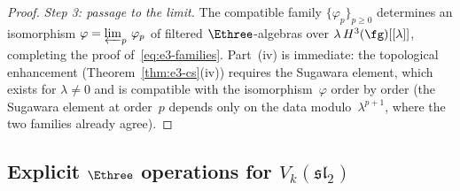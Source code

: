 \begin{proof}
\smallskip
\noindent\textit{Step 3: passage to the limit.}
The compatible family $\{\varphi_p\}_{p \geq 0}$
determines an isomorphism
$\varphi = \varprojlim_p\,\varphi_p$
of filtered $\Ethree$-algebras over
$\lambda\,H^3(\fg)[[\lambda]]$, completing the proof
of~\eqref{eq:e3-families}.
Part~(iv) is immediate: the topological enhancement
(Theorem~\ref{thm:e3-cs}(iv)) requires the Sugawara
element, which exists for $\lambda \neq 0$ and is
compatible with the isomorphism~$\varphi$ order by order
(the Sugawara element at order~$p$ depends only on the
data modulo~$\lambda^{p+1}$, where the two families
already agree).
\end{proof}

\subsection{Explicit $\Ethree$ operations for
$V_k(\mathfrak{sl}_2)$}
\label{subsec:e3-explicit}
